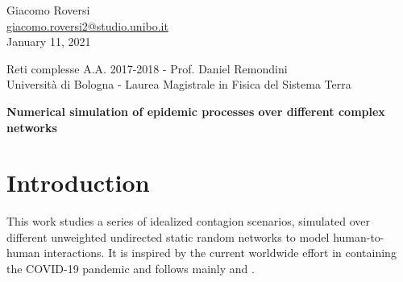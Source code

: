 \documentclass[DIV=12, BCOR=0pt]{scrartcl}  %
\begin{document}
%	
%



\begin{flushright}
	{\large Giacomo Roversi} \\ 
	{\small \href{mailto:giacomo.roversi2@studio.unibo.it}{giacomo.roversi2@studio.unibo.it} }\\
	\vskip0.15in
	{\large January 11, 2021}
\end{flushright}

\begin{flushleft}
	{\Large \color{gray}
		Reti complesse A.A. 2017-2018 - Prof. Daniel Remondini  \\
		Università di Bologna - Laurea Magistrale in Fisica del Sistema Terra}


	\vskip0.2in
	{\huge\textbf{Numerical simulation of epidemic processes over different complex networks}} 
	\vskip0.33in
	
\end{flushleft}
	
	\section*{Introduction}
	\label{sec:intro}
	This work studies a series of idealized contagion scenarios, simulated over different unweighted undirected static random networks to model human-to-human interactions. It is inspired by the current worldwide effort in containing the COVID-19 pandemic and follows mainly \citet{PastorSatorras} and \citet{Firth2020}.
	
\end{document}
